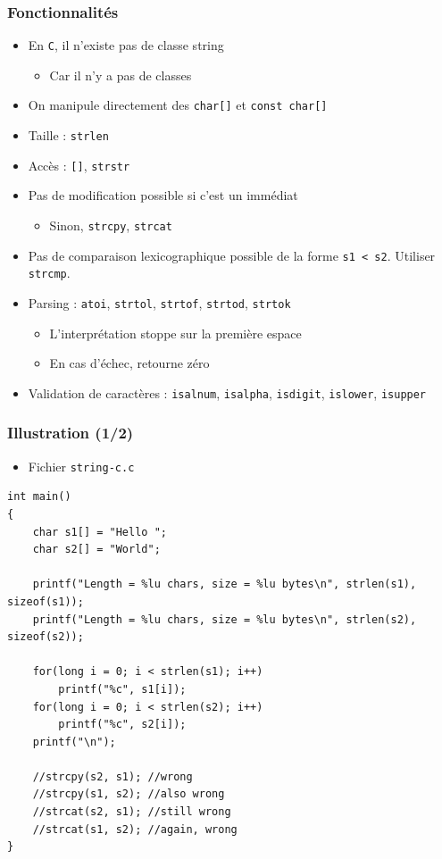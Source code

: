 \begin{frame}
\frametitle{Fonctionnalités}
\begin{itemize}[<+->]
\item En \texttt{C}, il n'existe pas de classe string
	\begin{itemize}
	\item Car il n'y a pas de classes
	\end{itemize}
\item On manipule directement des \lstinline|char[]| et \lstinline|const char[]|
\item Taille : \texttt{strlen}
\item Accès : \texttt{[]}, \texttt{strstr}
\item Pas de modification possible si c'est un immédiat
	\begin{itemize}
	\item Sinon, \texttt{strcpy}, \texttt{strcat}
	\end{itemize}
\item Pas de comparaison lexicographique possible de la forme \texttt{s1 < s2}.
Utiliser \texttt{strcmp}.
\item Parsing : \texttt{atoi}, \texttt{strtol}, \texttt{strtof}, \texttt{strtod}, \texttt{strtok}
	\begin{itemize}
	\item L'interprétation stoppe sur la première espace
	\item En cas d'échec, retourne zéro
	\end{itemize}
\item Validation de caractères : \texttt{isalnum}, \texttt{isalpha}, \texttt{isdigit}, \texttt{islower}, \texttt{isupper}
\end{itemize}
\end{frame}

\begin{frame}[containsverbatim]
\frametitle{Illustration (1/2)}
\begin{itemize}
\item Fichier \texttt{string-c.c}
\end{itemize}
\begin{lstlisting}
int main()
{
	char s1[] = "Hello "; 
	char s2[] = "World";

	printf("Length = %lu chars, size = %lu bytes\n", strlen(s1), sizeof(s1));
	printf("Length = %lu chars, size = %lu bytes\n", strlen(s2), sizeof(s2));

	for(long i = 0; i < strlen(s1); i++)
		printf("%c", s1[i]);
	for(long i = 0; i < strlen(s2); i++)
		printf("%c", s2[i]);
	printf("\n");

	//strcpy(s2, s1); //wrong
	//strcpy(s1, s2); //also wrong
	//strcat(s2, s1); //still wrong
	//strcat(s1, s2); //again, wrong		
}
\end{lstlisting}
\end{frame}

